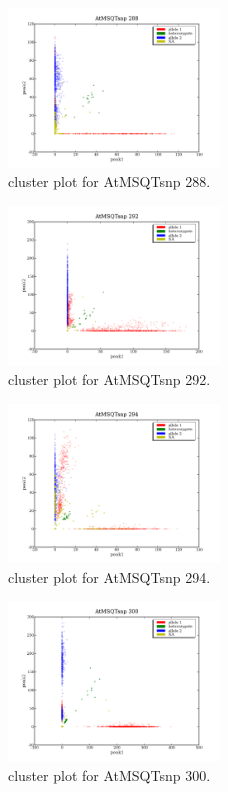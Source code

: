 \begin{figure}[H]
\includegraphics[width=0.5\textwidth]{figures/cluster_plot_AtMSQTsnp_288.png}
\caption{cluster plot for AtMSQTsnp 288.} \label{flAtMSQTsnp288}
\end{figure}
\begin{figure}[H]
\includegraphics[width=0.5\textwidth]{figures/cluster_plot_AtMSQTsnp_292.png}
\caption{cluster plot for AtMSQTsnp 292.} \label{flAtMSQTsnp292}
\end{figure}
\begin{figure}[H]
\includegraphics[width=0.5\textwidth]{figures/cluster_plot_AtMSQTsnp_294.png}
\caption{cluster plot for AtMSQTsnp 294.} \label{flAtMSQTsnp294}
\end{figure}
\begin{figure}[H]
\includegraphics[width=0.5\textwidth]{figures/cluster_plot_AtMSQTsnp_300.png}
\caption{cluster plot for AtMSQTsnp 300.} \label{flAtMSQTsnp300}
\end{figure}

